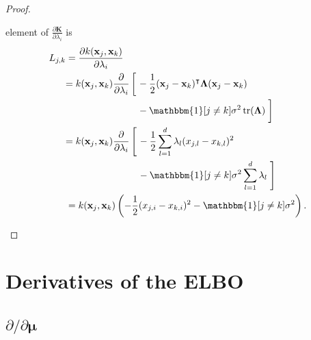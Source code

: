 \documentclass{mpaper}
\DeclareMathOperator{\tr}{tr}
\newcommand{\dl}{\frac{\partial}{\partial \lambda_i}}
\begin{document}
\begin{proof}
\begin{enumerate}
\begin{enumerate}
    element of $\frac{\partial \mathbf{K}}{\partial \lambda_i}$ is
    \begin{align*}
      L_{j,k} &= \frac{\partial k(\mathbf{x}_j, \mathbf{x}_k)}{\partial \lambda_i} \\
      &\begin{aligned}
        = k(\mathbf{x}_j, \mathbf{x}_k) \dl \left[ \vphantom{\frac{1}{2}} \right. &-\frac{1}{2}(\mathbf{x}_j - \mathbf{x}_k)^\intercal \bm\Lambda (\mathbf{x}_j - \mathbf{x}_k) \\
        &- \mathbbm{1}[j \ne k]\sigma^2\tr(\bm\Lambda) \left. \vphantom{\frac{1}{2}} \right]
      \end{aligned} \\
      &\begin{aligned}
        = k(\mathbf{x}_j, \mathbf{x}_k) \dl \left[ \vphantom{\sum_{k=1}^d} \right. &-\frac{1}{2} \sum_{l=1}^d \lambda_l (x_{j,l} - x_{k,l})^2 \\
        &- \mathbbm{1}[j \ne k]\sigma^2\sum_{l=1}^d \lambda_l \left. \vphantom{\sum_{l=1}^d} \right]
      \end{aligned} \\
      &= k(\mathbf{x}_j, \mathbf{x}_k) \left( -\frac{1}{2}(x_{j,i} - x_{k,i})^2 - \mathbbm{1}[j \ne k]\sigma^2 \right).
    \end{align*}
    \end{enumerate}
  \end{enumerate}
\end{proof}

\section{Derivatives of the ELBO}

\subsection{\texorpdfstring{$\partial/\partial\bm\mu$}{Derivative w.r.t. mu}}
\end{document}

